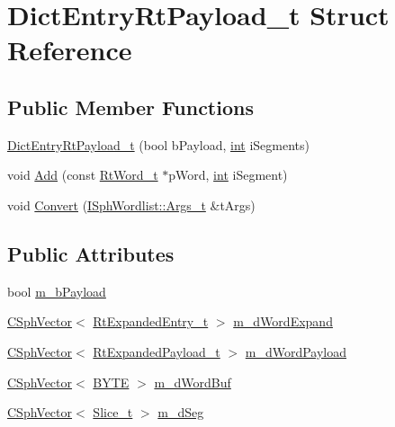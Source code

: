 \hypertarget{structDictEntryRtPayload__t}{\section{Dict\-Entry\-Rt\-Payload\-\_\-t Struct Reference}
\label{structDictEntryRtPayload__t}
}
\subsection*{Public Member Functions}
\begin{DoxyCompactItemize}
\item 
\hyperlink{structDictEntryRtPayload__t_a8739a8891c26d3def0110bcb33e91eec}{Dict\-Entry\-Rt\-Payload\-\_\-t} (bool b\-Payload, \hyperlink{sphinxexpr_8cpp_a4a26e8f9cb8b736e0c4cbf4d16de985e}{int} i\-Segments)
\item 
void \hyperlink{structDictEntryRtPayload__t_ae96d0b15a8768ed44e5516154fe19b51}{Add} (const \hyperlink{sphinxrt_8cpp_a97c12606a1350afbcdc489ed3428b1bb}{Rt\-Word\-\_\-t} $\ast$p\-Word, \hyperlink{sphinxexpr_8cpp_a4a26e8f9cb8b736e0c4cbf4d16de985e}{int} i\-Segment)
\item 
void \hyperlink{structDictEntryRtPayload__t_a8a5ae6f60d7c046791e0743e2c40d47e}{Convert} (\hyperlink{structISphWordlist_1_1Args__t}{I\-Sph\-Wordlist\-::\-Args\-\_\-t} \&t\-Args)
\end{DoxyCompactItemize}
\subsection*{Public Attributes}
\begin{DoxyCompactItemize}
\item 
bool \hyperlink{structDictEntryRtPayload__t_a5c5cfcc8403b3da3b1e36b42935c3d58}{m\-\_\-b\-Payload}
\item 
\hyperlink{classCSphVector}{C\-Sph\-Vector}$<$ \hyperlink{structRtExpandedEntry__t}{Rt\-Expanded\-Entry\-\_\-t} $>$ \hyperlink{structDictEntryRtPayload__t_a450df29225c83a8857cd48d485351c9d}{m\-\_\-d\-Word\-Expand}
\item 
\hyperlink{classCSphVector}{C\-Sph\-Vector}$<$ \hyperlink{structRtExpandedPayload__t}{Rt\-Expanded\-Payload\-\_\-t} $>$ \hyperlink{structDictEntryRtPayload__t_aed747b065a0096ab58249cb9cd7b4e53}{m\-\_\-d\-Word\-Payload}
\item 
\hyperlink{classCSphVector}{C\-Sph\-Vector}$<$ \hyperlink{sphinxstd_8h_a4ae1dab0fb4b072a66584546209e7d58}{B\-Y\-T\-E} $>$ \hyperlink{structDictEntryRtPayload__t_a232ddc44e203eec3f66122b69c4bceb0}{m\-\_\-d\-Word\-Buf}
\item 
\hyperlink{classCSphVector}{C\-Sph\-Vector}$<$ \hyperlink{structSlice__t}{Slice\-\_\-t} $>$ \hyperlink{structDictEntryRtPayload__t_a1ec2d456b0d57c305f987e17856c067a}{m\-\_\-d\-Seg}
\end{DoxyCompactItemize}


